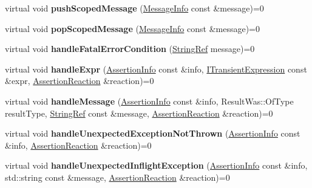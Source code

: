 \begin{DoxyCompactItemize}
\item 
\mbox{\label{structCatch_1_1IResultCapture_a91d154c1e087e383dcde5aad95cb6a05}} 
virtual void {\bfseries push\+Scoped\+Message} (\hyperlink{structCatch_1_1MessageInfo}{Message\+Info} const \&message)=0
\item 
\mbox{\label{structCatch_1_1IResultCapture_a42bcb13276706bf8c3ce081ce16d37fd}} 
virtual void {\bfseries pop\+Scoped\+Message} (\hyperlink{structCatch_1_1MessageInfo}{Message\+Info} const \&message)=0
\item 
\mbox{\label{structCatch_1_1IResultCapture_a48559e6598ba9474b903697b69c769b2}} 
virtual void {\bfseries handle\+Fatal\+Error\+Condition} (\hyperlink{classCatch_1_1StringRef}{String\+Ref} message)=0
\item 
\mbox{\label{structCatch_1_1IResultCapture_a59a2b05391e464954575d2afb6d5d607}} 
virtual void {\bfseries handle\+Expr} (\hyperlink{structCatch_1_1AssertionInfo}{Assertion\+Info} const \&info, \hyperlink{structCatch_1_1ITransientExpression}{I\+Transient\+Expression} const \&expr, \hyperlink{structCatch_1_1AssertionReaction}{Assertion\+Reaction} \&reaction)=0
\item 
\mbox{\label{structCatch_1_1IResultCapture_a21788ebc64571abf322b80c8cc51794d}} 
virtual void {\bfseries handle\+Message} (\hyperlink{structCatch_1_1AssertionInfo}{Assertion\+Info} const \&info, Result\+Was\+::\+Of\+Type result\+Type, \hyperlink{classCatch_1_1StringRef}{String\+Ref} const \&message, \hyperlink{structCatch_1_1AssertionReaction}{Assertion\+Reaction} \&reaction)=0
\item 
\mbox{\label{structCatch_1_1IResultCapture_a6382ed20486e2d9a020da971c6d5c53d}} 
virtual void {\bfseries handle\+Unexpected\+Exception\+Not\+Thrown} (\hyperlink{structCatch_1_1AssertionInfo}{Assertion\+Info} const \&info, \hyperlink{structCatch_1_1AssertionReaction}{Assertion\+Reaction} \&reaction)=0
\item 
\mbox{\label{structCatch_1_1IResultCapture_afc97bc69829185222f955ebeef97adfe}} 
virtual void {\bfseries handle\+Unexpected\+Inflight\+Exception} (\hyperlink{structCatch_1_1AssertionInfo}{Assertion\+Info} const \&info, std\+::string const \&message, \hyperlink{structCatch_1_1AssertionReaction}{Assertion\+Reaction} \&reaction)=0

\end{DoxyCompactItemize}
